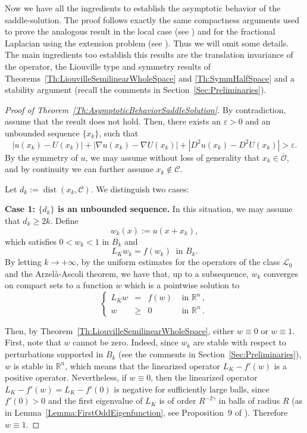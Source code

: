 \documentclass[12pt,reqno]{amsart}
\theoremstyle{definition}
\theoremstyle{remark}
\newcommand{\con}[1]{\mathbb{#1}}
\newcommand{\R}{\con{R}} %
\newcommand{\ccal}{\mathscr{C}}
\newcommand{\lcal}{\mathcal{L}}
\newcommand{\ocal}{\mathcal{O}}
\newcommand{\s}{\gamma}
\newcommand\beqc[1]{\left\{\begin{array}{#1}}
\newcommand\eeqc{\end{array} \right.}
\def\PDEsystem{rcll}
\DeclareMathOperator{\dist}{dist}
\numberwithin{equation}{section}
\begin{document}
Now we have all the ingredients to establish the asymptotic behavior of the saddle-solution. The proof follows exactly the same compactness arguments used to prove the analogous result in the local case (see \cite{CabreTerraII}) and for the fractional Laplacian using the extension problem (see \cite{Cinti-Saddle, Cinti-Saddle2}). Thus we will omit some details. The main ingredients too establish this results are the translation invariance of the operator, the Liouville type and symmetry results of Theorems~\ref{Th:LiouvilleSemilinearWholeSpace} and \ref{Th:SymmHalfSpace} and a stability argument (recall the comments in Section~\ref{Sec:Preliminaries}). 



\begin{proof}[Proof of Theorem~\ref{Th:AsymptoticBehaviorSaddleSolution}]
	By contradiction, assume that the result does not hold. Then, there exists an $\varepsilon>0$ and an unbounded sequence $\{x_k\}$, such that
	\begin{equation}
	\label{Eq:ContradictionAsymptotic}
	|u(x_k)-U(x_k)|+|\nabla u(x_k)-\nabla U(x_k)|+|D^2u(x_k)-D^2U(x_k)| > \varepsilon.
	\end{equation}
	By the symmetry of $u$, we may assume without loss of generality that $x_k \in \overline{\ocal}$, and by continuity we can further assume $ x_k \notin \ccal$. 
	
	Let $d_k:=\dist(x_k,\ccal)$. We distinguish two cases:
	
	\textbf{Case 1: $\{d_k\}$ is an unbounded sequence.} In this situation, we may assume that $d_k \geq 2k$. Define
	$$
	w_k(x) := u(x+x_k), 
	$$
	which satisfies $0<w_k<1$ in $\overline{B_k}$ and
	$$
	L_K w_k = f(w_k) \ \textrm{ in } B_k.
	$$
	By letting $k\to +\infty$, by the uniform estimates for the operators of the class $\lcal_0$ and the Arzelà-Ascoli theorem, we have that, up to a subsequence, $w_k$ converges on compact sets to a function $w$ which is a pointwise solution to
	$$
	\beqc{\PDEsystem}
	L_K  w &=& f(w) & \textrm{ in }\R^n\,,\\
	w &\geq& 0 & \textrm{ in } \R^n\,.
	\eeqc
	$$
	
	Then, by Theorem~\ref{Th:LiouvilleSemilinearWholeSpace}, either $w\equiv 0$ or $w\equiv 1$. First, note that $w$ cannot be zero. Indeed, since $w_k$ are stable with respect to perturbations supported in $B_k$ (see the comments in Section~\ref{Sec:Preliminaries}), $w$ is stable in $\R^n$, which means that the linearized operator $L_K-f'(w)$ is a positive operator. Nevertheless, if $w\equiv 0$, then the linearized operator $L_K-f'(w) = L_K-f'(0)$ is negative for sufficiently large balls, since $f'(0)>0$ and the first eigenvalue of $L_K$ is of order $R^{-2\s}$ in balls of radius $R$ (as in Lemma~\ref{Lemma:FirstOddEigenfunction}, see Proposition~9 of \cite{ServadeiValdinoci}). Therefore $w\equiv 1$. 
	

\end{proof}
\end{document}
